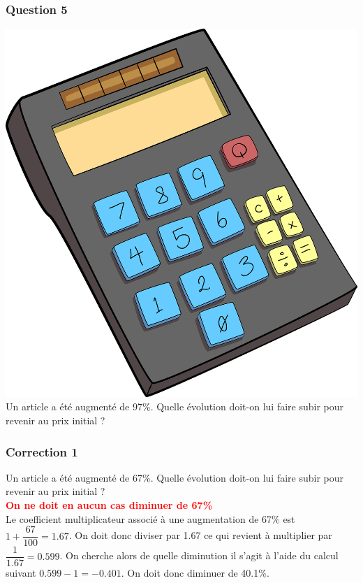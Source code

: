 \documentclass[15pt, mathserif]{beamer}
\begin{document}
\begin{frame} 
	\frametitle{Question 5}
 \includegraphics[scale=0.01]{calculatrice} Un article a été augmenté de 97\%. Quelle évolution doit-on lui faire subir pour revenir au prix initial ? \end{frame}


\begin{frame}
\vspace{-10mm}
	\frametitle{Correction 1}
\vspace*{1cm} Un article a été augmenté de 67\%. Quelle évolution doit-on lui faire subir pour revenir au prix initial ? \\ \bcattention \textcolor{red}{\textbf{On ne doit en aucun cas diminuer de 67\% }} \\ Le coefficient multiplicateur associé à une augmentation de 67\% est $1+\dfrac{67}{100}=1.67$. On doit donc diviser par 1.67 ce qui revient à multiplier par $\dfrac{1}{1.67}=0.599$. On cherche alors de quelle diminution il s'agit à l'aide du calcul suivant $0.599-1=-0.401$. On doit donc diminuer de 40.1\%. \\ \begin{center}  
  \end{center}\end{frame}
\end{document}
